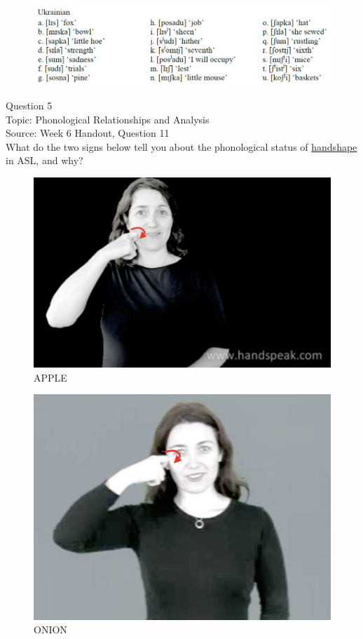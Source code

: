 \documentclass[12pt]{article}
\begin{document}
\begin{figure}[H]
\includegraphics{../images/ukrainian.png}
\end{figure}

\newpage

{\large Question 5}\\

Topic: Phonological Relationships and Analysis\\
Source: Week 6 Handout, Question 11\\

What do the two signs below tell you about the phonological status of \underline{handshape} in ASL, and why?\\

\begin{figure}[H]
\includegraphics{../images/asl_apple.png}
\caption{APPLE}
\end{figure}
\begin{figure}[H]
\includegraphics{../images/asl_onion.png}
\caption{ONION}
\end{figure}
\end{document}
